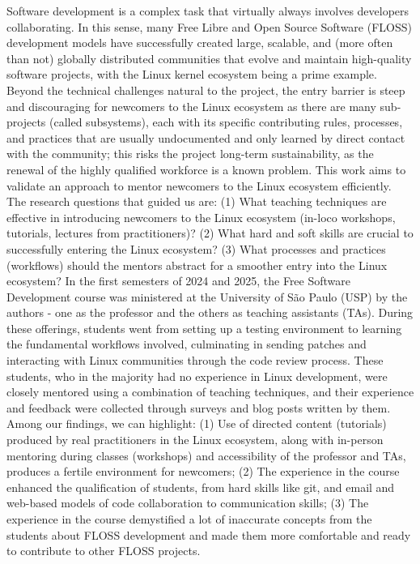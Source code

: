 Software development is a complex task that virtually always involves developers collaborating. In this sense, many Free Libre and Open Source Software (FLOSS) development models have successfully created large, scalable, and (more often than not) globally distributed communities that evolve and maintain high-quality software projects, with the Linux kernel ecosystem being a prime example. Beyond the technical challenges natural to the project, the entry barrier is steep and discouraging for newcomers to the Linux ecosystem as there are many sub-projects (called subsystems), each with its specific contributing rules, processes, and practices that are usually undocumented and only learned by direct contact with the community; this risks the project long-term sustainability, as the renewal of the highly qualified workforce is a known problem. This work aims to validate an approach to mentor newcomers to the Linux ecosystem efficiently. The research questions that guided us are: (1) What teaching techniques are effective in introducing newcomers to the Linux ecosystem (in-loco workshops, tutorials, lectures from practitioners)? (2) What hard and soft skills are crucial to successfully entering the Linux ecosystem? (3) What processes and practices (workflows) should the mentors abstract for a smoother entry into the Linux ecosystem? In the first semesters of 2024 and 2025, the Free Software Development course was ministered at the University of São Paulo (USP) by the authors - one as the professor and the others as teaching assistants (TAs). During these offerings, students went from setting up a testing environment to learning the fundamental workflows involved, culminating in sending patches and interacting with Linux communities through the code review process. These students, who in the majority had no experience in Linux development, were closely mentored using a combination of teaching techniques, and their experience and feedback were collected through surveys and blog posts written by them. Among our findings, we can highlight: (1) Use of directed content (tutorials) produced by real practitioners in the Linux ecosystem, along with in-person mentoring during classes (workshops) and accessibility of the professor and TAs, produces a fertile environment for newcomers; (2) The experience in the course enhanced the qualification of students, from hard skills like git, and email and web-based models of code collaboration to communication skills; (3) The experience in the course demystified a lot of inaccurate concepts from the students about FLOSS development and made them more comfortable and ready to contribute to other FLOSS projects.
